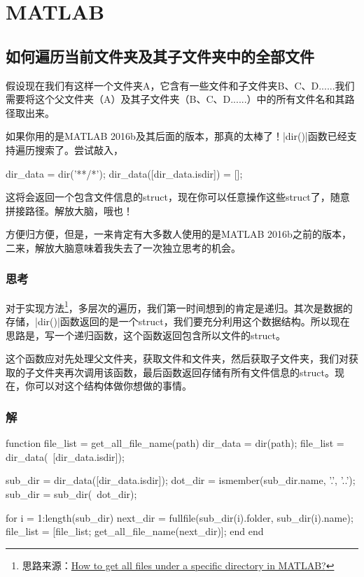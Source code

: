 \chapter{MATLAB}

\section{如何遍历当前文件夹及其子文件夹中的全部文件}

假设现在我们有这样一个文件夹A，它含有一些文件和子文件夹B、C、D......我们需要将这个父文件夹（A）及其子文件夹（B、C、D......）中的所有文件名和其路径取出来。

如果你用的是MATLAB 2016b及其后面的版本，那真的太棒了！\Matlabinline|dir()|函数已经支持遍历搜索了。尝试敲入，

\begin{Matlabcode}
dir_data = dir('**/*');
dir_data([dir_data.isdir]) = [];  %
\end{Matlabcode}

这将会返回一个包含文件信息的struct，现在你可以任意操作这些struct了，随意拼接路径。解放大脑，哦也！

方便归方便，但是，一来肯定有大多数人使用的是MATLAB 2016b之前的版本，二来，解放大脑意味着我失去了一次独立思考的机会。

\subsection*{思考}

对于实现方法\footnote{思路来源：\href{https://stackoverflow.com/questions/2652630/how-to-get-all-files-under-a-specific-directory-in-matlab}{How to get all files under a specific directory in MATLAB?}}，多层次的遍历，我们第一时间想到的肯定是递归。其次是数据的存储，\Matlabinline|dir()|函数返回的是一个struct，我们要充分利用这个数据结构。所以现在思路是，写一个递归函数，这个函数返回包含所以文件的struct。

这个函数应对先处理父文件夹，获取文件和文件夹，然后获取子文件夹，我们对获取的子文件夹再次调用该函数，最后函数返回存储有所有文件信息的struct。现在，你可以对这个结构体做你想做的事情。

\subsection*{解}

\begin{Matlabcode}
function file_list = get_all_file_name(path)
    dir_data = dir(path);
    file_list = dir_data(~[dir_data.isdir]);  %
    
    sub_dir = dir_data([dir_data.isdir]);  %
    dot_dir = ismember({sub_dir.name}, {'.', '..'});  %
    sub_dir = sub_dir(~dot_dir);  %
    
    for i = 1:length(sub_dir)
        next_dir = fullfile(sub_dir(i).folder, sub_dir(i).name);  %
        file_list = [file_list; get_all_file_name(next_dir)];  %
    end
end
\end{Matlabcode}

